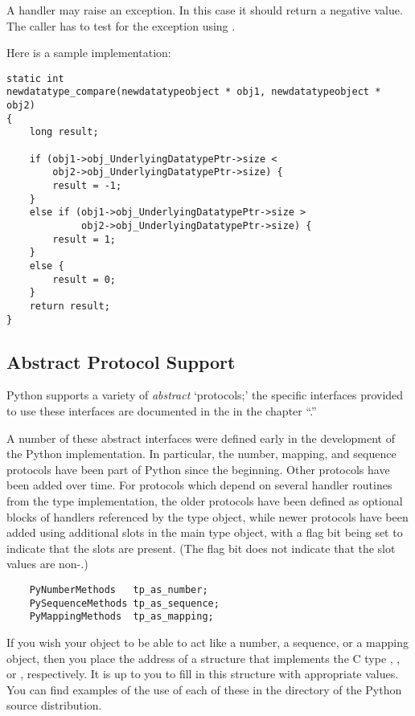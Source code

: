 A  handler may raise an exception.  In this case it
should return a negative value.  The caller has to test for the
exception using .


Here is a sample implementation:

\begin{verbatim}
static int
newdatatype_compare(newdatatypeobject * obj1, newdatatypeobject * obj2)
{
    long result;
 
    if (obj1->obj_UnderlyingDatatypePtr->size <
        obj2->obj_UnderlyingDatatypePtr->size) {
        result = -1;
    }
    else if (obj1->obj_UnderlyingDatatypePtr->size >
             obj2->obj_UnderlyingDatatypePtr->size) {
        result = 1;
    }
    else {
        result = 0;
    }
    return result;
}
\end{verbatim}


\subsection{Abstract Protocol Support}

Python supports a variety of \emph{abstract} `protocols;' the specific
interfaces provided to use these interfaces are documented in the
 in the
chapter ``.''

A number of these abstract interfaces were defined early in the
development of the Python implementation.  In particular, the number,
mapping, and sequence protocols have been part of Python since the
beginning.  Other protocols have been added over time.  For protocols
which depend on several handler routines from the type implementation,
the older protocols have been defined as optional blocks of handlers
referenced by the type object, while newer protocols have been added
using additional slots in the main type object, with a flag bit being
set to indicate that the slots are present.  (The flag bit does not
indicate that the slot values are non-\NULL.)

\begin{verbatim}
    PyNumberMethods   tp_as_number;
    PySequenceMethods tp_as_sequence;
    PyMappingMethods  tp_as_mapping;
\end{verbatim}

If you wish your object to be able to act like a number, a sequence,
or a mapping object, then you place the address of a structure that
implements the C type ,
, or , respectively.
It is up to you to fill in this structure with appropriate values. You
can find examples of the use of each of these in the 
directory of the Python source distribution.


